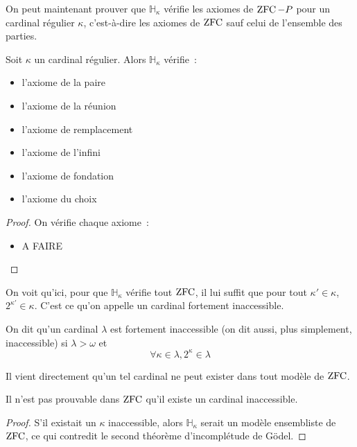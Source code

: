 On peut maintenant prouver que $\mathbb H_\kappa$ vérifie les axiomes de
$\operatorname{ZFC} - P$ pour un cardinal régulier $\kappa$, c'est-à-dire les axiomes de
$\operatorname{ZFC}$ sauf celui de l'ensemble des parties.

\begin{property}
  Soit $\kappa$ un cardinal régulier. Alors $\mathbb H_\kappa$ vérifie~:
  \begin{itemize}
  \item l'axiome de la paire
  \item l'axiome de la réunion
  \item l'axiome de remplacement
  \item l'axiome de l'infini
  \item l'axiome de fondation
  \item l'axiome du choix
  \end{itemize}
\end{property}

\begin{proof}
  On vérifie chaque axiome~:
  \begin{itemize}
  \item A FAIRE
  \end{itemize}
\end{proof}

On voit qu'ici, pour que $\mathbb H_\kappa$ vérifie tout $\operatorname{ZFC}$, il lui suffit
que pour tout $\kappa' \in \kappa$, $2^{\kappa'} \in \kappa$. C'est ce qu'on
appelle un cardinal fortement inaccessible.

\begin{definition}
  On dit qu'un cardinal $\lambda$ est fortement inaccessible (on dit aussi, plus
  simplement, inaccessible) si $\lambda > \omega$ et
  \[\forall \kappa \in \lambda, 2^\kappa \in \lambda\]
\end{definition}

Il vient directement qu'un tel cardinal ne peut exister dans tout modèle de
$\operatorname{ZFC}$.

\begin{proposition}
  Il n'est pas prouvable dans $\operatorname{ZFC}$ qu'il existe un cardinal inaccessible.
\end{proposition}

\begin{proof}
  S'il existait un $\kappa$ inaccessible, alors $\mathbb H_\kappa$ serait un
  modèle ensembliste de $\operatorname{ZFC}$, ce qui contredit le second théorème
  d'incomplétude de Gödel.
\end{proof}


